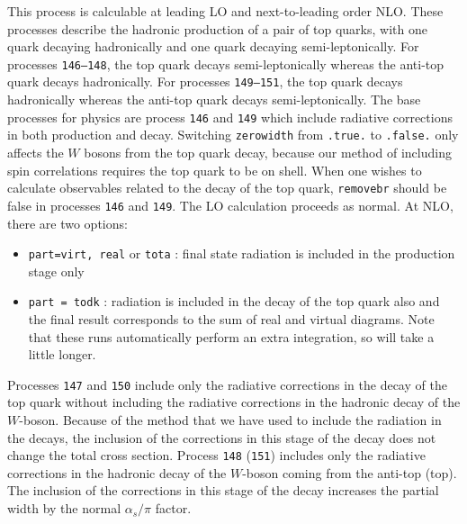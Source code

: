 
This process is calculable at leading LO and next-to-leading order NLO.
These processes describe the hadronic production of a pair of top
quarks, with one quark decaying hadronically and one quark decaying
semi-leptonically.  For processes {\tt 146--148}, the top quark decays
semi-leptonically whereas the anti-top quark decays hadronically.  For
processes {\tt 149--151}, the top quark decays hadronically whereas the
anti-top quark decays semi-leptonically.  The base processes for
physics are process {\tt 146} and {\tt 149} which include
radiative corrections in both production and decay.  Switching {\tt zerowidth} from
{\tt .true.} to {\tt .false.} only affects the $W$ bosons from the top
quark decay, because our method of including spin correlations
requires the top quark to be on shell.
When one wishes to calculate observables related to the decay of the top
quark, {\tt removebr} should be false in processes {\tt 146} and {\tt 149}.
The LO calculation proceeds as normal. At NLO, there are two options:
\begin{itemize}
\item {\tt part=virt, real} or {\tt tota} : final state radiation is included
in the production stage only
\item {\tt part = todk} : radiation is included in the decay of the top
quark also and the final result corresponds to the sum of real and virtual
diagrams.
Note that these runs automatically perform an extra integration, so
will take a little longer.
\end{itemize}


Processes {\tt 147} and {\tt 150} include only the radiative
corrections in the decay of the top quark without including
the radiative corrections in the hadronic decay of the $W$-boson.
Because of the method that we have used to include the radiation in the decays,
the inclusion of the corrections in this stage of the decay does not change the
total cross section.
Process {\tt 148} ({\tt 151}) includes only the radiative corrections
in the hadronic decay of the $W$-boson coming from the anti-top (top).
The inclusion of the corrections in this stage of the decay increases the
partial width by the normal $\alpha_s/\pi$ factor.
